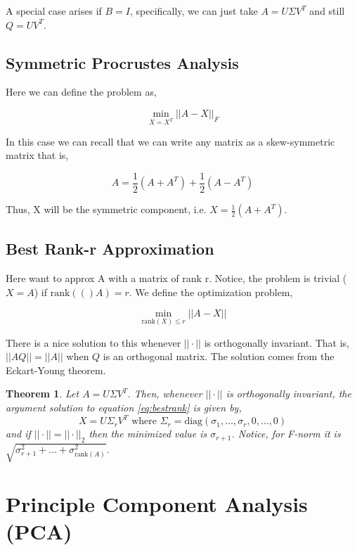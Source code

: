\documentclass[twoside]{article}
\newcommand\rank[1]{\text{rank}(#1)}
\newcommand\diag[1]{\text{diag}(#1)}
\newtheorem{theorem}{Theorem}[section]
\begin{document}
A special case arises if $B = I$, specifically, we can just take $A = U\Sigma V^T$ and still $Q=UV^T$.

\subsection{Symmetric Procrustes Analysis}

Here we can define the problem as,

\begin{equation}
\min_{X=X^T} ||A-X||_F
\end{equation}

In this case we can recall that we can write any matrix as a skew-symmetric matrix that is,

$$A = \frac{1}{2}(A+A^T)+\frac{1}{2}(A-A^T)$$

Thus, X will be the symmetric component, i.e. $X = \frac{1}{2}(A+A^T)$. 

\subsection{Best Rank-r Approximation}

Here want to approx A with a matrix of rank r. Notice, the problem is trivial ($X=A$) if $\rank(A)=r$. We define the optimization problem,

\begin{equation} \label{eq:bestrank}
\min_{\rank{X}\leq r} ||A-X||
\end{equation}

There is a nice solution to this whenever $||\cdot||$ is orthogonally invariant. That is, $||AQ||=||A||$ when $Q$ is an orthogonal matrix. The solution comes from the Eckart-Young theorem.

\begin{theorem}
Let $A = U\Sigma V^T$. Then, whenever $||\cdot||$ is orthogonally invariant, the argument solution to equation \ref{eq:bestrank} is given by,
$$ X = U\Sigma_rV^T \text{ where } \Sigma_r = \diag{\sigma_1,\dots,\sigma_r,0,\dots,0}$$
and if $||\cdot|| = ||\cdot||_2$ then the minimized value is $\sigma_{r+1}$. Notice, for F-norm it is $\sqrt{\sigma_{r+1}^2 +\dots+\sigma_{\rank{A}}^2}$.
\end{theorem}

\section{Principle Component Analysis (PCA)}
\end{document}
